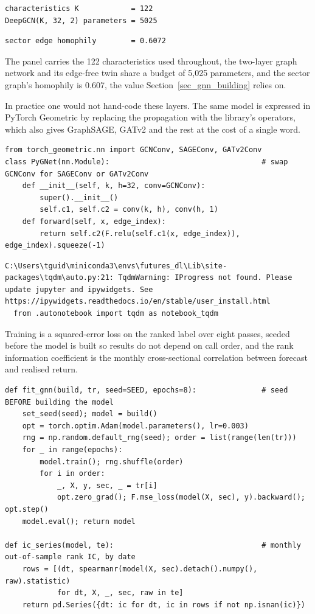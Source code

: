 \begin{verbatim}
characteristics K            = 122
DeepGCN(K, 32, 2) parameters = 5025
\end{verbatim}

\begin{verbatim}
sector edge homophily        = 0.6072
\end{verbatim}

The panel carries the 122 characteristics used throughout, the two-layer graph network and its edge-free twin share a budget of 5,025 parameters, and the sector graph's homophily is 0.607, the value Section~\ref{sec_gnn_building} relies on.

In practice one would not hand-code these layers. The same model is expressed in PyTorch Geometric by replacing the propagation with the library's operators, which also gives GraphSAGE, GATv2 and the rest at the cost of a single word.

\begin{verbatim}
from torch_geometric.nn import GCNConv, SAGEConv, GATv2Conv
class PyGNet(nn.Module):                                   # swap GCNConv for SAGEConv or GATv2Conv
    def __init__(self, k, h=32, conv=GCNConv):
        super().__init__()
        self.c1, self.c2 = conv(k, h), conv(h, 1)
    def forward(self, x, edge_index):
        return self.c2(F.relu(self.c1(x, edge_index)), edge_index).squeeze(-1)
\end{verbatim}

\begin{verbatim}
C:\Users\tguid\miniconda3\envs\futures_dl\Lib\site-packages\tqdm\auto.py:21: TqdmWarning: IProgress not found. Please update jupyter and ipywidgets. See https://ipywidgets.readthedocs.io/en/stable/user_install.html
  from .autonotebook import tqdm as notebook_tqdm
\end{verbatim}

Training is a squared-error loss on the ranked label over eight passes, seeded before the model is built so results do not depend on call order, and the rank information coefficient is the monthly cross-sectional correlation between forecast and realised return.

\begin{verbatim}
def fit_gnn(build, tr, seed=SEED, epochs=8):               # seed BEFORE building the model
    set_seed(seed); model = build()
    opt = torch.optim.Adam(model.parameters(), lr=0.003)
    rng = np.random.default_rng(seed); order = list(range(len(tr)))
    for _ in range(epochs):
        model.train(); rng.shuffle(order)
        for i in order:
            _, X, y, sec, _ = tr[i]
            opt.zero_grad(); F.mse_loss(model(X, sec), y).backward(); opt.step()
    model.eval(); return model

def ic_series(model, te):                                  # monthly out-of-sample rank IC, by date
    rows = [(dt, spearmanr(model(X, sec).detach().numpy(), raw).statistic)
            for dt, X, _, sec, raw in te]
    return pd.Series({dt: ic for dt, ic in rows if not np.isnan(ic)})
\end{verbatim}

